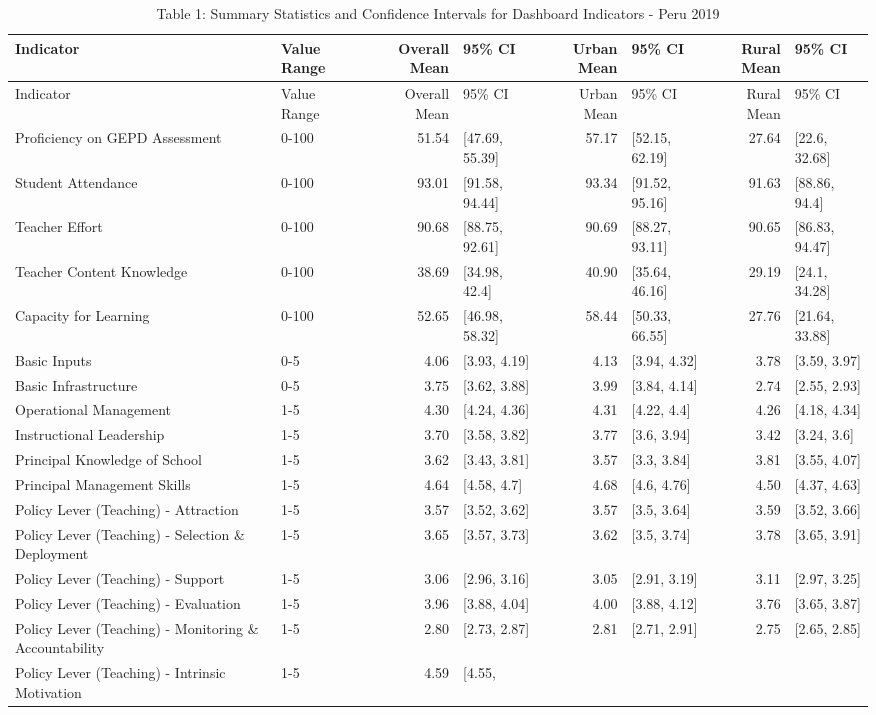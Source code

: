 \documentclass[]{article}
\begin{document}
\begin{longtable}[]{@{}llrlrlrl@{}}
\caption{Table 1: Summary Statistics and Confidence Intervals for
Dashboard Indicators - Peru 2019}\tabularnewline
\toprule
Indicator & Value Range & Overall Mean & 95\% CI & Urban Mean & 95\% CI
& Rural Mean & 95\% CI\tabularnewline
\midrule
\endfirsthead
\toprule
Indicator & Value Range & Overall Mean & 95\% CI & Urban Mean & 95\% CI
& Rural Mean & 95\% CI\tabularnewline
\midrule
\endhead
Proficiency on GEPD Assessment & 0-100 & 51.54 & {[}47.69, 55.39{]} &
57.17 & {[}52.15, 62.19{]} & 27.64 & {[}22.6, 32.68{]}\tabularnewline
Student Attendance & 0-100 & 93.01 & {[}91.58, 94.44{]} & 93.34 &
{[}91.52, 95.16{]} & 91.63 & {[}88.86, 94.4{]}\tabularnewline
Teacher Effort & 0-100 & 90.68 & {[}88.75, 92.61{]} & 90.69 & {[}88.27,
93.11{]} & 90.65 & {[}86.83, 94.47{]}\tabularnewline
Teacher Content Knowledge & 0-100 & 38.69 & {[}34.98, 42.4{]} & 40.90 &
{[}35.64, 46.16{]} & 29.19 & {[}24.1, 34.28{]}\tabularnewline
Capacity for Learning & 0-100 & 52.65 & {[}46.98, 58.32{]} & 58.44 &
{[}50.33, 66.55{]} & 27.76 & {[}21.64, 33.88{]}\tabularnewline
Basic Inputs & 0-5 & 4.06 & {[}3.93, 4.19{]} & 4.13 & {[}3.94, 4.32{]} &
3.78 & {[}3.59, 3.97{]}\tabularnewline
Basic Infrastructure & 0-5 & 3.75 & {[}3.62, 3.88{]} & 3.99 & {[}3.84,
4.14{]} & 2.74 & {[}2.55, 2.93{]}\tabularnewline
Operational Management & 1-5 & 4.30 & {[}4.24, 4.36{]} & 4.31 & {[}4.22,
4.4{]} & 4.26 & {[}4.18, 4.34{]}\tabularnewline
Instructional Leadership & 1-5 & 3.70 & {[}3.58, 3.82{]} & 3.77 &
{[}3.6, 3.94{]} & 3.42 & {[}3.24, 3.6{]}\tabularnewline
Principal Knowledge of School & 1-5 & 3.62 & {[}3.43, 3.81{]} & 3.57 &
{[}3.3, 3.84{]} & 3.81 & {[}3.55, 4.07{]}\tabularnewline
Principal Management Skills & 1-5 & 4.64 & {[}4.58, 4.7{]} & 4.68 &
{[}4.6, 4.76{]} & 4.50 & {[}4.37, 4.63{]}\tabularnewline
Policy Lever (Teaching) - Attraction & 1-5 & 3.57 & {[}3.52, 3.62{]} &
3.57 & {[}3.5, 3.64{]} & 3.59 & {[}3.52, 3.66{]}\tabularnewline
Policy Lever (Teaching) - Selection \& Deployment & 1-5 & 3.65 &
{[}3.57, 3.73{]} & 3.62 & {[}3.5, 3.74{]} & 3.78 & {[}3.65,
3.91{]}\tabularnewline
Policy Lever (Teaching) - Support & 1-5 & 3.06 & {[}2.96, 3.16{]} & 3.05
& {[}2.91, 3.19{]} & 3.11 & {[}2.97, 3.25{]}\tabularnewline
Policy Lever (Teaching) - Evaluation & 1-5 & 3.96 & {[}3.88, 4.04{]} &
4.00 & {[}3.88, 4.12{]} & 3.76 & {[}3.65, 3.87{]}\tabularnewline
Policy Lever (Teaching) - Monitoring \& Accountability & 1-5 & 2.80 &
{[}2.73, 2.87{]} & 2.81 & {[}2.71, 2.91{]} & 2.75 & {[}2.65,
2.85{]}\tabularnewline
Policy Lever (Teaching) - Intrinsic Motivation & 1-5 & 4.59 & {[}4.55,

\end{longtable}
\end{document}
